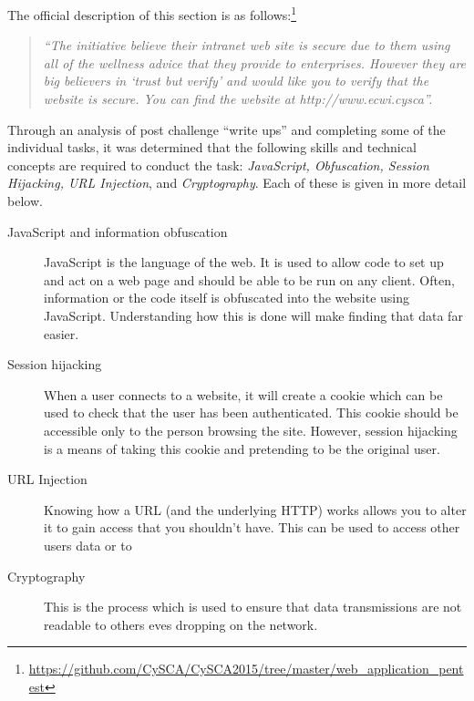 \documentclass[twoside,a4paper,11pt]{report}
\begin{document}
			The official description of this section is as follows:\footnote{\url{https://github.com/CySCA/CySCA2015/tree/master/web\_application\_pentest}}
			\begin{quote}
				\textit{
				``The initiative believe their intranet web site is secure due to them using all of the wellness advice that they provide to enterprises. However they are big believers in `trust but verify' and would like you to verify that the website is secure. You can find the website at http://www.ecwi.cysca''. }
			\end{quote}

			Through an analysis of post challenge ``write ups'' and completing some of the individual tasks, 
			it was determined that the following skills and technical concepts are required to conduct the task: 
			\textit{JavaScript, Obfuscation, Session Hijacking, URL Injection}, and \textit{Cryptography}. 
			Each of these is given in more detail below. 
			\begin{description}
				\item[JavaScript and information obfuscation]
					JavaScript is the language of the web. It is used to allow code to set up and act on a web page and should be able to be run on any client. 
					Often, information or the code itself is obfuscated into the website using JavaScript.
					Understanding how this is done will make finding that data far easier. 
				\item[Session hijacking]
					When a user connects to a website, it will create a cookie which can be used to check that the user has been authenticated. 
					This cookie should be accessible only to the person browsing the site. 
					However, session hijacking is a means of taking this cookie and pretending to be the original user. 
				\item[URL Injection]
					Knowing how a URL (and the underlying HTTP) works allows you to alter it to gain access that you shouldn't have. 
					This can be used to access other users data or to 
				\item[Cryptography]
					This is the process which is used to ensure that data transmissions are not readable to others eves dropping on the network. 
			\end{description}
\end{document}
